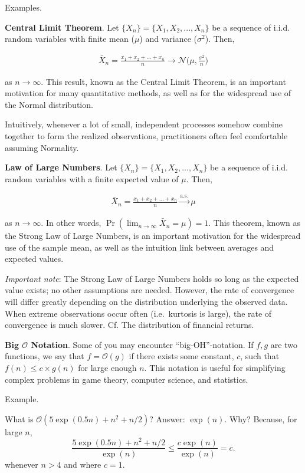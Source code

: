 \documentclass[]{book}
\theoremstyle{definition}
\theoremstyle{definition}
\theoremstyle{definition}
\theoremstyle{remark}
\begin{document}
Examples.

\textbf{Central Limit Theorem}. Let \(\{X_n\} = \{X_1, X_2, ..., X_n\}\)
be a sequence of i.i.d. random variables with finite mean (\(\mu\)) and
variance (\(\sigma^2\)). Then,

\begin{align*} 
\bar{X}_n = \frac{x_1 + x_2 + ... + x_n}{n} \to \mathcal{N}\bigg(\mu, \frac{\sigma^2}{n}\bigg) 
\end{align*}

as \(n\to \infty\). This result, known as the Central Limit Theorem, is
an important motivation for many quantitative methods, as well as for
the widespread use of the Normal distribution.

Intuitively, whenever a lot of small, independent processes somehow
combine together to form the realized observations, practitioners often
feel comfortable assuming Normality.

\textbf{Law of Large Numbers}. Let \(\{X_n\} = \{X_1, X_2, ..., X_n\}\)
be a sequence of i.i.d. random variables with a finite expected value of
\(\mu\). Then,

\begin{align*} 
\bar{X}_n = \frac{x_1 + x_2 + ... + x_n}{n} \stackrel{\textrm{a.s.}}{\to} \mu
\end{align*}

as \(n\to \infty\). In other words,
\(\Pr( \lim_{n\to\infty}\bar{X}_n = \mu) = 1\). This theorem, known as
the Strong Law of Large Numbers, is an important motivation for the
widespread use of the sample mean, as well as the intuition link between
averages and expected values.

\emph{Important note}: The Strong Law of Large Numbers holds so long as
the expected value exists; no other assumptions are needed. However, the
rate of convergence will differ greatly depending on the distribution
underlying the observed data. When extreme observations occur often
(i.e.~kurtosis is large), the rate of convergence is much slower. Cf.
The distribution of financial returns.

\textbf{Big \(\mathcal{O}\) Notation}. Some of you may encounter
``big-OH''-notation. If \(f, g\) are two functions, we say that
\(f = \mathcal{O}(g)\) if there exists some constant, \(c\), such that
\(f(n) \leq c \times g(n)\) for large enough \(n\). This notation is
useful for simplifying complex problems in game theory, computer
science, and statistics.

Example.

What is \(\mathcal{O}( 5\exp(0.5 n) + n^2 + n / 2)\)? Answer:
\(\exp(n)\). Why? Because, for large \(n\), \[
\frac{ 5\exp(0.5 n) + n^2 + n / 2 }{ \exp(n)} \leq \frac{ c \exp(n) }{ \exp(n)} = c. 
\] whenever \(n > 4\) and where \(c = 1\).
\end{document}
